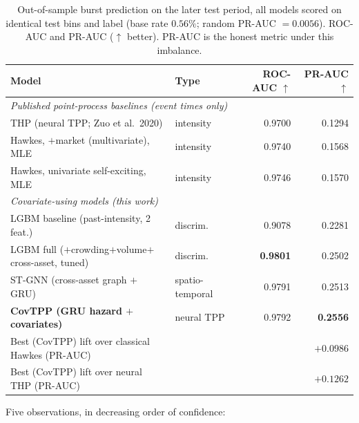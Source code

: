 \documentclass[11pt,a4paper]{article}
\begin{document}
\begin{table}[ht]
\centering
\caption{Out-of-sample burst prediction on the later test period, all models scored on identical test bins and label (base rate $0.56\%$; random PR-AUC $=0.0056$). ROC-AUC and PR-AUC ($\uparrow$ better). PR-AUC is the honest metric under this imbalance.}
\label{tab:m2}
\begin{tabular}{llrr}
\toprule
Model & Type & ROC-AUC $\uparrow$ & PR-AUC $\uparrow$ \\
\midrule
\multicolumn{4}{l}{\emph{Published point-process baselines (event times only)}} \\
THP (neural TPP; Zuo et al.\ 2020)        & intensity  & 0.9700 & 0.1294 \\
Hawkes, $+$market (multivariate), MLE      & intensity  & 0.9740 & 0.1568 \\
Hawkes, univariate self-exciting, MLE      & intensity  & 0.9746 & 0.1570 \\
\midrule
\multicolumn{4}{l}{\emph{Covariate-using models (this work)}} \\
LGBM baseline (past-intensity, 2 feat.)    & discrim.\  & 0.9078 & 0.2281 \\
LGBM full ($+$crowding$+$volume$+$cross-asset, tuned) & discrim.\ & \textbf{0.9801} & 0.2502 \\
ST-GNN (cross-asset graph $+$ GRU)         & spatio-temporal & 0.9791 & 0.2513 \\
\textbf{CovTPP (GRU hazard $+$ covariates)} & neural TPP & 0.9792 & \textbf{0.2556} \\
\midrule
Best (CovTPP) lift over classical Hawkes (PR-AUC) &        &        & $+0.0986$ \\
Best (CovTPP) lift over neural THP (PR-AUC)       &        &        & $+0.1262$ \\
\bottomrule
\end{tabular}
\end{table}

Five observations, in decreasing order of confidence:
\end{document}
